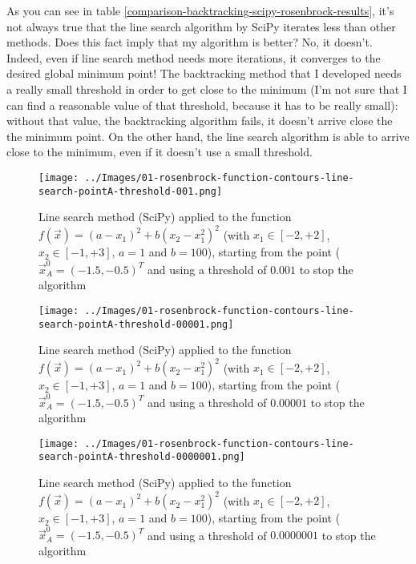         As you can see in table \ref{comparison-backtracking-scipy-rosenbrock-results}, it's not always true that the line search algorithm by SciPy iterates less than other methods. Does this fact imply that my algorithm is better? No, it doesn't. Indeed, even if line search method needs more iterations, it converges to the desired global minimum point! The backtracking method that I developed needs a really small threshold in order to get close to the minimum (I'm not sure that I can find a reasonable value of that threshold, because it has to be really small): without that value, the backtracking algorithm fails, it doesn't arrive close the the minimum point. On the other hand, the line search algorithm is able to arrive close to the minimum, even if it doesn't use a small threshold.
        \begin{figure}
            \centering
            \texttt{[image: ../Images/01-rosenbrock-function-contours-line-search-pointA-threshold-001.png]}
            \caption{Line search method (SciPy) applied to the function \(f(\vec{x}) = (a - x_1)^2 + b(x_2 - x_1^2)^2\) (with \(x_1 \in [-2, +2]\), \(x_2 \in [-1, +3]\), \(a=1\) and \(b=100\)), starting from the point (\(\vec{x}_A^0 = (-1.5,-0.5)^T\) and using a threshold of \(0.001\) to stop the algorithm}
            \label{rosenbrock-function-contours-line-search-pointA-threshold-001}
        \end{figure}
        \begin{figure}
            \centering
            \texttt{[image: ../Images/01-rosenbrock-function-contours-line-search-pointA-threshold-00001.png]}
            \caption{Line search method (SciPy) applied to the function \(f(\vec{x}) = (a - x_1)^2 + b(x_2 - x_1^2)^2\) (with \(x_1 \in [-2, +2]\), \(x_2 \in [-1, +3]\), \(a=1\) and \(b=100\)), starting from the point (\(\vec{x}_A^0 = (-1.5,-0.5)^T\) and using a threshold of \(0.00001\) to stop the algorithm}
            \label{rosenbrock-function-contours-line-search-pointA-threshold-00001}
        \end{figure}
        \begin{figure}
            \centering
            \texttt{[image: ../Images/01-rosenbrock-function-contours-line-search-pointA-threshold-0000001.png]}
            \caption{Line search method (SciPy) applied to the function \(f(\vec{x}) = (a - x_1)^2 + b(x_2 - x_1^2)^2\) (with \(x_1 \in [-2, +2]\), \(x_2 \in [-1, +3]\), \(a=1\) and \(b=100\)), starting from the point (\(\vec{x}_A^0 = (-1.5,-0.5)^T\) and using a threshold of \(0.0000001\) to stop the algorithm}
            \label{rosenbrock-function-contours-line-search-pointA-threshold-000001}
        \end{figure}

